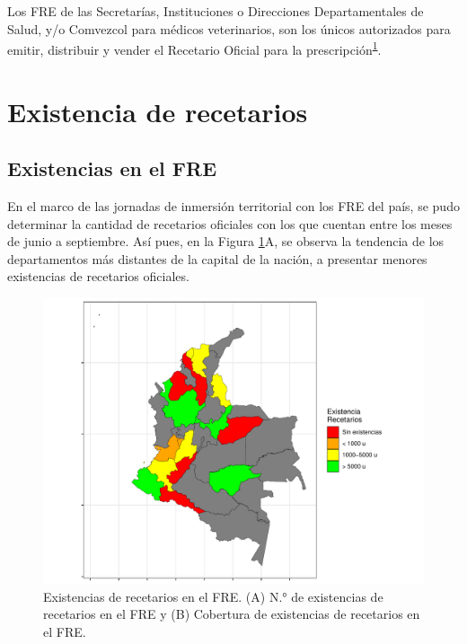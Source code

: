 \documentclass[
  oneside]{book}
\begin{document}
Los FRE de las Secretarías, Instituciones o Direcciones Departamentales de Salud, y/o Comvezcol para médicos veterinarios, son los únicos autorizados para emitir, distribuir y vender el Recetario Oficial para la prescripción\textsuperscript{\protect\hyperlink{ref-MSPS1478-2006}{1}}.

\hypertarget{existencia-de-recetarios}{%
\section{Existencia de recetarios}\label{existencia-de-recetarios}}

\hypertarget{existencias-en-el-fre}{%
\subsection{Existencias en el FRE}\label{existencias-en-el-fre}}

En el marco de las jornadas de inmersión territorial con los FRE del país, se pudo determinar la cantidad de recetarios oficiales con los que cuentan entre los meses de junio a septiembre. Así pues, en la Figura \ref{fig:existenciasRecetarios}A, se observa la tendencia de los departamentos más distantes de la capital de la nación, a presentar menores existencias de recetarios oficiales.

\begin{figure}

{\centering \includegraphics[width=1\linewidth]{InformeFinal_files/figure-latex/existenciasRecetarios-1} 

}

\caption{Existencias de recetarios en el FRE. (A) N.° de existencias de recetarios en el FRE y (B) Cobertura de existencias de recetarios en el FRE.}\label{fig:existenciasRecetarios}
\end{figure}
\end{document}
